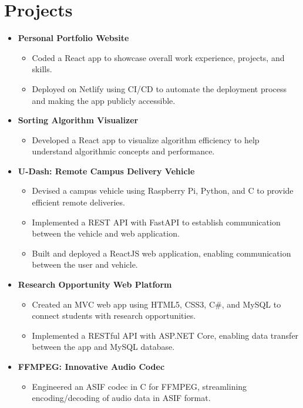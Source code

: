 \documentclass[letterpaper,11pt]{article}
\begin{document}

\section{\textbf{Projects}}
\begin{itemize}[leftmargin=0.05in, label={}]
	\item{
	            \textbf{Personal Portfolio Website}
	            \begin{itemize} [label=$\bullet$]
		            \item{Coded a React app to showcase overall work experience, projects, and skills.}
		            \item {Deployed on Netlify using CI/CD to automate the deployment process and making the app publicly
					accessible.}
	            \end{itemize}
	      }
	\item{
	            \textbf{Sorting Algorithm Visualizer}
	            \begin{itemize} [label=$\bullet$]
		            \item{Developed a React app to visualize algorithm efficiency to help understand algorithmic concepts and performance.}
	            \end{itemize}
	      }
	\item{
	            \textbf{U-Dash: Remote Campus Delivery Vehicle}
	            \begin{itemize} [label=$\bullet$]
		            \item{Devised a campus vehicle using Raspberry Pi, Python, and C to provide efficient remote deliveries.}
		            \item {Implemented a REST API with FastAPI to establish communication between the vehicle and web
					application.}
		            \item{Built and deployed a ReactJS web application, enabling communication between the user
					and vehicle.}

	            \end{itemize}
	      }
	\item{
	            \textbf{Research Opportunity Web Platform}
	            \begin{itemize} [label=$\bullet$]
		            \item{Created an MVC web app using HTML5, CSS3, C\#, and MySQL to connect students with research opportunities.}
		            \item{Implemented a RESTful API
					with ASP.NET Core, enabling data transfer between the app and MySQL database.}
	            \end{itemize}
	      }
	\item{
	            \textbf{FFMPEG: Innovative Audio Codec}
	            \begin{itemize} [label=$\bullet$]
		            \item{Engineered an ASIF codec in C for FFMPEG, streamlining encoding/decoding of audio data in ASIF
					format.}
	            \end{itemize}
	      }

\end{itemize}
\end{document}
